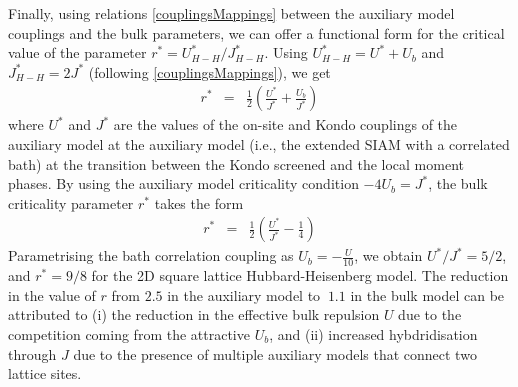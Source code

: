 \documentclass[reprint,hidelinks,onecolumn]{revtex4-2}
\begin{document}
Finally, using relations \eqref{couplingsMappings} between the auxiliary model couplings and the bulk parameters, we can offer a functional form for the critical value of the parameter $r^{*} = U_{H-H}^{*}/J_{H-H}^{*}$. Using \(U_{H-H}^{*} = U^* + U_b\) and \(J_{H-H}^{*} = 2J^*\) (following \eqref{couplingsMappings}), we get
\begin{equation}\begin{aligned}
	r^{*} &=& \frac{1}{2}\left(\frac{U^{*}}{J^{*}} + \frac{U_b}{J^*}\right)
\end{aligned}\end{equation}
where $U^{*}$ and $J^{*}$ are the values of the on-site and Kondo couplings of the auxiliary model at the auxiliary model (i.e., the extended SIAM with a correlated bath) at the transition between the Kondo screened and the local moment phases. By using the auxiliary model criticality condition \(-4U_b = J^*\), the bulk criticality parameter \(r^*\) takes the form
\begin{equation}\begin{aligned}
	r^{*} &=& \frac{1}{2}\left(\frac{U^{*}}{J^{*}} - \frac{1}{4}\right)
\end{aligned}\end{equation}
Parametrising the bath correlation coupling as $U_{b}=-\frac{U}{10}$, we obtain $U^{*}/J^{*}=5/2$, and $r^{*} = 9/8$ for the 2D square lattice Hubbard-Heisenberg model. The reduction in the value of \(r\) from \(2.5\) in the auxiliary model to \(~1.1\) in the bulk model can be attributed to (i) the reduction in the effective bulk repulsion \(U\) due to the competition coming from the attractive \(U_b\), and (ii) increased hybdridisation through \(J\) due to the presence of multiple auxiliary models that connect two lattice sites.
\end{document}
